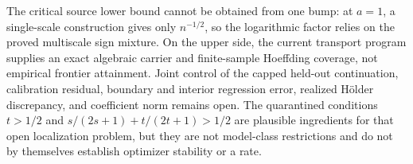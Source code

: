 The critical source lower bound cannot be obtained from one bump: at \(a=1\), a single-scale construction gives only \(n^{-1/2}\), so the logarithmic factor relies on the proved multiscale sign mixture. On the upper side, the current transport program supplies an exact algebraic carrier and finite-sample Hoeffding coverage, not empirical frontier attainment. Joint control of the capped held-out continuation, calibration residual, boundary and interior regression error, realized Hölder discrepancy, and coefficient norm remains open. The quarantined conditions \(t>1/2\) and \(s/(2s+1)+t/(2t+1)>1/2\) are plausible ingredients for that open localization problem, but they are not model-class restrictions and do not by themselves establish optimizer stability or a rate.